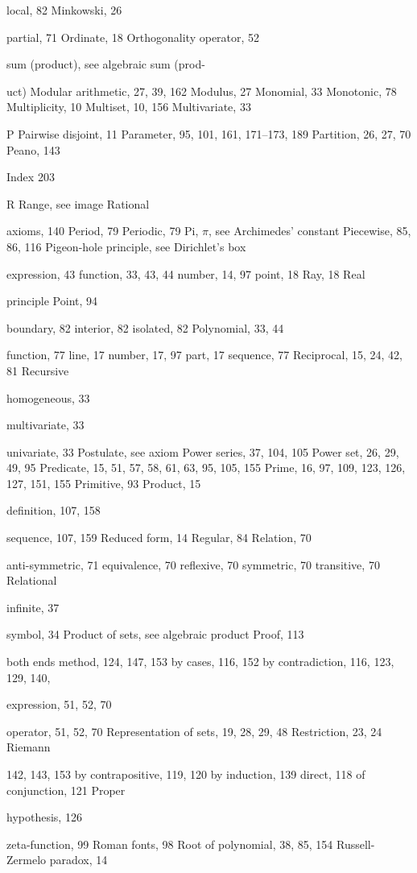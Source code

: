 \documentclass[11pt]{article}
\theoremstyle{plain}
\theoremstyle{definition}
\begin{document}
local, 82 Minkowski, 26

partial, 71 Ordinate, 18 Orthogonality operator, 52

sum (product), see algebraic sum (prod-

uct) Modular arithmetic, 27, 39, 162 Modulus, 27 Monomial, 33 Monotonic, 78 Multiplicity, 10 Multiset, 10, 156 Multivariate, 33

P Pairwise disjoint, 11 Parameter, 95, 101, 161, 171--173, 189 Partition, 26, 27, 70 Peano, 143

Index 203

R Range, see image Rational

axioms, 140 Period, 79 Periodic, 79 Pi, $\pi$, see Archimedes' constant Piecewise, 85, 86, 116 Pigeon-hole principle, see Dirichlet's box

expression, 43 function, 33, 43, 44 number, 14, 97 point, 18 Ray, 18 Real

principle Point, 94

boundary, 82 interior, 82 isolated, 82 Polynomial, 33, 44

function, 77 line, 17 number, 17, 97 part, 17 sequence, 77 Reciprocal, 15, 24, 42, 81 Recursive

homogeneous, 33

multivariate, 33

univariate, 33 Postulate, see axiom Power series, 37, 104, 105 Power set, 26, 29, 49, 95 Predicate, 15, 51, 57, 58, 61, 63, 95, 105, 155 Prime, 16, 97, 109, 123, 126, 127, 151, 155 Primitive, 93 Product, 15

definition, 107, 158

sequence, 107, 159 Reduced form, 14 Regular, 84 Relation, 70

anti-symmetric, 71 equivalence, 70 reflexive, 70 symmetric, 70 transitive, 70 Relational

infinite, 37

symbol, 34 Product of sets, see algebraic product Proof, 113

both ends method, 124, 147, 153 by cases, 116, 152 by contradiction, 116, 123, 129, 140,

expression, 51, 52, 70

operator, 51, 52, 70 Representation of sets, 19, 28, 29, 48 Restriction, 23, 24 Riemann

142, 143, 153 by contrapositive, 119, 120 by induction, 139 direct, 118 of conjunction, 121 Proper

hypothesis, 126

zeta-function, 99 Roman fonts, 98 Root of polynomial, 38, 85, 154 Russell-Zermelo paradox, 14
\end{document}
